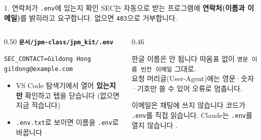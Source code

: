 \begin{frame}[fragile]{1. 연락처가 \texttt{.env}에 있는지 확인 }
\small
\noindent SEC는 자동으로 받는 프로그램에 \textbf{연락처(이름과 이메일)}를 밝히라고 요구합니다. 없으면 \texttt{403}으로 거부합니다.
\vspace{0.4em}
\begin{columns}[T]
\begin{column}{0.50\textwidth}
\textbf{\texttt{문서/jpm-class/jpm\_kit/.env}}
\begin{Verbatim}
SEC_CONTACT=Gildong Hong gildong@example.com
\end{Verbatim}
\begin{itemize}\setlength\itemsep{1pt}
\item VS Code 탐색기에서 열어 \textbf{있는지만} 확인하고 탭을 닫습니다 (없으면 지금 적습니다)
\item \texttt{.env.txt}로 보이면 이름을 \texttt{.env}로 바꿉니다
\end{itemize}
\end{column}
\begin{column}{0.46\textwidth}
\begin{alertblock}{한글 이름은 안 됩니다}
따옴표 없이 \texttt{영문 이름 빈칸 이메일} 그대로.\\
요청 머리글(User-Agent)에는 영문·숫자·기호만 쓸 수 있어 오류로 멈춥니다.\\
\end{alertblock}
\begin{block}{이메일은 채팅에 쓰지 않습니다}
코드가 \texttt{.env}를 직접 읽습니다. Claude는 \texttt{.env}를 열지 않습니다 .
\end{block}
\end{column}
\end{columns}
\end{frame}

